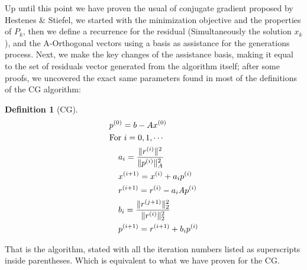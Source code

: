\documentclass[]{article}
\theoremstyle{definition}
\newtheorem{definition}{Definition}      %
\begin{document}
            Up until this point we have proven the usual of conjugate gradient proposed by Hestenes \& Stiefel\cite{paper:cg_original}, we started with the minimization objective and the properties of $P_k$, then we define a recurrence for the residual (Simultaneously the solution $x_k$), and the A-Orthogonal vectors using a basis as assistance for the generations process. Next, we make the key changes of the assistance basis, making it equal to the set of residuals vector generated from the algorithm itself; after some proofs, we uncovered the exact same parameters found in most of the definitions of the CG algorithm:
            \begin{definition}[CG]\label{def:CG}
                \begin{align}
                    & p^{(0)} = b - Ax^{(0)} 
                    \\&
                    \text{For } i = 0,1, \cdots
                    \\&\hspace{1.1em}
                    \begin{aligned}
                        & a_{i} = \frac{\Vert r^{(i)}\Vert^2}{\Vert p^{(i)}\Vert^2_A}
                        \\
                        & x^{(i + 1)} = x^{(i)} + a_i p^{(i)}
                        \\
                        & r^{(i + 1)} = r^{(i)} - a_iAp^{(i)}
                        \\
                        & b_{i} = \frac{\Vert r^{(j + 1)}\Vert_2^2}{\Vert r^{(i)}\Vert_2^2}
                        \\
                        & p^{(i + 1)} = r^{(i + 1)} + b_{i}p^{(i)}
                    \end{aligned}
                \end{align}
            \end{definition}
            That is the algorithm, stated with all the iteration numbers listed as superscripts inside parentheses. Which is equivalent to what we have proven for the CG.
\end{document}
